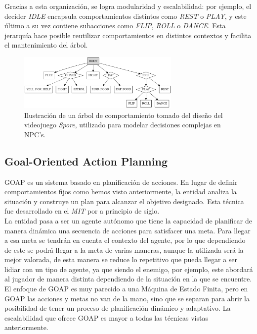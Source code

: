 Gracias a esta organización, se logra modularidad y escalabilidad: por ejemplo, el decider \textit{IDLE} encapsula comportamientos distintos como \textit{REST} o \textit{PLAY}, y este último a su vez contiene subacciones como \textit{FLIP}, \textit{ROLL} o \textit{DANCE}. Esta jerarquía hace posible reutilizar comportamientos en distintos contextos y facilita el mantenimiento del árbol.
\begin{figure}[t]
	\centering
	\includegraphics[width = 0.7\textwidth]{Imagenes/BT_Spoore.png}
	\caption[Árbol de comportamiento de Spore]{Ilustración de un árbol de comportamiento tomado del diseño del videojuego \textit{Spore}, utilizado para modelar decisiones complejas en NPC's.\footnotemark}
	\label{fig:BT Spore}
\end{figure}
\subsection{Goal-Oriented Action Planning}

GOAP es un sistema basado en planificación de acciones. En lugar de definir comportamientos fijos como hemos visto anteriormente, la entidad analiza la situación y construye un plan para alcanzar el objetivo designado.
Esta técnica fue desarrollado en el \textit{MIT} por \textit{\citet{GOAP_Jeff_Orkin}} a principio de siglo. \\

La entidad pasa a ser un agente autónomo que tiene la capacidad de planificar de manera dinámica una secuencia de acciones para satisfacer una meta. Para llegar a esa meta se tendrán en cuenta el contexto del agente, por lo que dependiendo de este se podrá llegar a la meta de varias maneras, aunque la utilizada será la mejor valorada, de esta manera se reduce lo repetitivo que pueda llegar a ser lidiar con un tipo de agente, ya que siendo el enemigo, por ejemplo, este abordará al jugador de manera distinta dependiendo de la situación en la que se encuentre.\\

El enfoque de GOAP es muy parecido a una Máquina de Estado Finita, pero en GOAP las acciones y metas no van de la mano, sino que se separan para abrir la posibilidad de tener un proceso de planificación dinámico y adaptativo.
La escalabilidad que ofrece GOAP es mayor a todas las técnicas vistas anteriormente.\\

